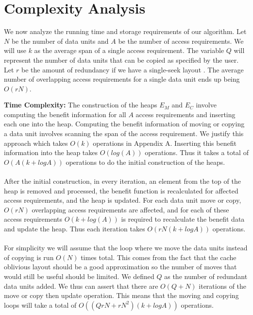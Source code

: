 \section{Complexity Analysis}

We now analyze the running time and storage requirements of our algorithm. Let $N$ be the number of data units and $A$ be the number of access requirements. We will use $k$ as the average span of a single access requirement. The variable $Q$ will represent the number of data units that can be copied as specified by the user. Let $r$ be the amount of redundancy if we have a single-seek layout \cite{singleseeklayout}. The average number of overlapping access requirements for a single data unit ends up being $O(rN)$. 

{\bf Time Complexity:} The construction of the heaps $E_M$ and $E_C$ involve computing the benefit information for all $A$ access requirements and inserting each one into the heap. Computing the benefit information of moving or copying a data unit involves scanning the span of the access requirement. We justify this approach which takes $O(k)$ operations in Appendix A. Inserting this benefit information into the heap takes $O(log (A))$ operations. Thus it takes a total of $O(A (k + logA))$ operations to do the initial construction of the heaps. \\
\\
After the initial construction, in every iteration, an element from the top of the heap is removed and processed, the benefit function is recalculated for affected access requirements, and the heap is updated. For each data unit move or copy, $O(rN)$ overlapping access requirements are affected, and for each of these access requirements $O(k+log(A))$ is required to recalculate the benefit data and update the heap. Thus each iteration takes $O(rN(k + logA))$ operations.\\
\\
For simplicity we will assume that the loop where we move the data units instead of copying is run $O(N)$ times total. This comes from the fact that the cache oblivious layout \cite{cacheobliviouslayout} should be a good approximation so the number of moves that would still be useful should be limited. We defined $Q$ as the number of redundant data units added. We thus can assert that there are $O(Q + N)$ iterations of the move or copy then update operation. This means that the moving and copying loops will take a total of $O((QrN + rN^2)(k + logA))$ operations. \\
